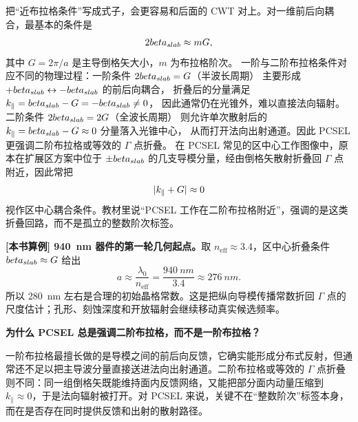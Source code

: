把“近布拉格条件”写成式子，会更容易和后面的 CWT 对上。对一维前后向耦合，最基本的条件是
\begin{equation}
2beta_{slab} \approx mG,
\label{eq:bragg_1d}
\end{equation}
其中 $G=2\pi/a$ 是主导倒格矢大小，$m$ 为布拉格阶次。
一阶与二阶布拉格条件对应不同的物理过程：一阶条件 $2beta_{slab}=G$（半波长周期）
主要形成 $+beta_{slab}\leftrightarrow-beta_{slab}$ 的前后向耦合，
折叠后的分量满足 $k_\parallel=beta_{slab}-G=-beta_{slab}\neq 0$，
因此通常仍在光锥外，难以直接法向辐射。二阶条件 $2beta_{slab}=2G$（全波长周期）
则允许单次散射后的 $k_\parallel=beta_{slab}-G\approx 0$ 分量落入光锥中心，
从而打开法向出射通道。因此 PCSEL 更强调二阶布拉格或等效的 $\Gamma$ 点折叠。
在 PCSEL 常见的区中心工作图像中，原本在扩展区方案中位于 $\pm beta_{slab}$
的几支导模分量，经由倒格矢散射折叠回 $\Gamma$ 点附近，因此常把
\begin{equation}
|k_\parallel+G|\approx 0
\label{eq:gamma_folding_condition}
\end{equation}
视作区中心耦合条件。教材里说“PCSEL 工作在二阶布拉格附近”，强调的是这类折叠回路，而不是孤立的整数阶次标签。

\begin{ExampleBox}
\textbf{[本书算例] \SI{940}{nm} 器件的第一轮几何起点。}取 $n_{\mathrm{eff}}\approx3.4$，区中心折叠条件 $beta_{slab}\approx G$ 给出
\[
a\approx\frac{\lambda_0}{n_{\mathrm{eff}}}
=\frac{\SI{940}{nm}}{3.4}
\approx\SI{276}{nm}.
\]
所以 \SI{280}{nm} 左右是合理的初始晶格常数。这是把纵向导模传播常数折回 $\Gamma$ 点的尺度估计；孔形、刻蚀深度和开放辐射会继续移动真实候选频率。
\end{ExampleBox}

\begin{ExampleBox}
\textbf{为什么 PCSEL 总是强调二阶布拉格，而不是一阶布拉格？}

一阶布拉格最擅长做的是导模之间的前后向反馈，它确实能形成分布式反射，但通常还不足以把主导波分量直接送进法向出射通道。二阶布拉格或等效的 $\Gamma$ 点折叠则不同：同一组倒格矢既能维持面内反馈网络，又能把部分面内动量压缩到 $k_\parallel\approx 0$，于是法向辐射被打开。对 PCSEL 来说，关键不在“整数阶次”标签本身，而在是否存在同时提供反馈和出射的散射路径。
\end{ExampleBox}
